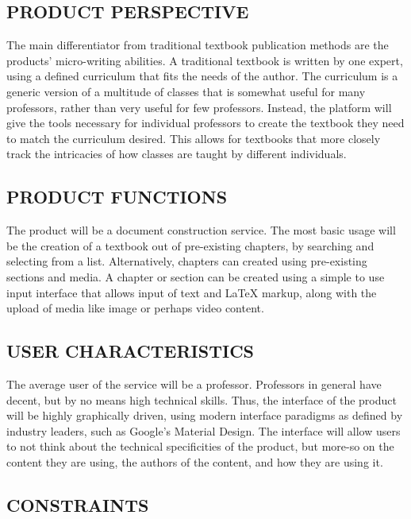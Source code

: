 \documentclass[letterpaper, 10pt, draftclsnofoot, compsoc, onecolumn]{IEEEtran}
\begin{document}
\subsection[PRODUCT PERSPECTIVE]{\rmfamily\bfseries\color{black} PRODUCT PERSPECTIVE}

{\noindent
The main differentiator from traditional textbook publication methods are the products'
micro-writing abilities. A traditional textbook is written by one expert, using a defined
curriculum that fits the needs of the author. The curriculum is a generic version of a
multitude of classes that is somewhat useful for many professors, rather than very useful
for few professors. Instead, the platform will give the tools necessary for individual 
professors to create the textbook they need to match the curriculum desired. This allows 
for textbooks that more closely track the intricacies of how classes are taught by 
different individuals.}

\subsection[PRODUCT FUNCTIONS]{\rmfamily\bfseries\color{black} PRODUCT FUNCTIONS}

{\noindent 
The product will be a document construction service. The most basic usage will be the 
creation of a textbook out of pre-existing chapters, by searching and selecting from a 
list. Alternatively, chapters can created using pre-existing sections and media.
A chapter or section can be created using a simple to use input interface that
allows input of text and LaTeX markup, along with the upload of media like image or
perhaps video content.}

\subsection[USER CHARACTERISTICS]{\rmfamily\bfseries\color{black} USER CHARACTERISTICS}

{\noindent 
The average user of the service will be a professor. Professors in general have
decent, but by no means high technical skills. Thus, the interface of the product
will be highly graphically driven, using modern interface paradigms as defined
by industry leaders, such as Google's Material Design. The interface will allow
users to not think about the technical specificities of the product, but more-so
on the content they are using, the authors of the content, and how they are using it.}

\subsection[CONSTRAINTS]{\rmfamily\bfseries\color{black} CONSTRAINTS}
\end{document}
